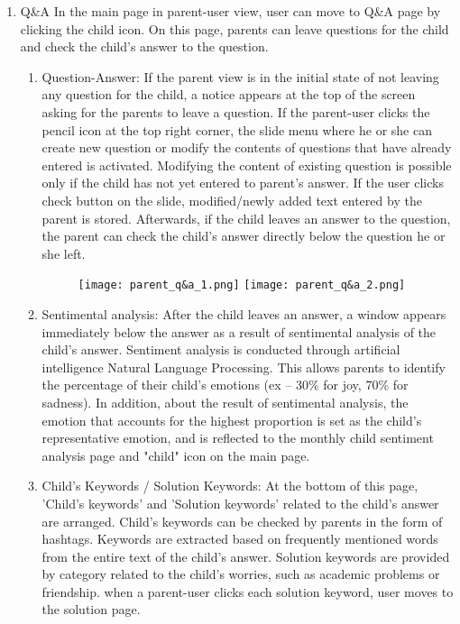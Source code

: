 \documentclass[conference]{IEEEtran}
\begin{document}
\begin{enumerate}
            \item Q\&A \hfill \break
            In the main page in parent-user view, user can move to Q\&A page by clicking the child icon. On this page, parents can leave questions for the child and check the child's answer to the question.
            
            \begin{enumerate}
                \item Question-Answer: If the parent view is in the initial state of not leaving any question for the child, a notice appears at the top of the screen asking for the parents to leave a question. If the parent-user clicks the pencil icon at the top right corner, the slide menu where he or she can create new question or modify the contents of questions that have already entered is activated. Modifying the content of existing question is possible only if the child has not yet entered to parent's answer. If the user clicks check button on the slide, modified/newly added text entered by the parent is stored. Afterwards, if the child leaves an answer to the question, the parent can check the child's answer directly below the question he or she left.
                 \begin{figure}[H]
                 \centering
                 \texttt{[image: parent\_q\&a\_1.png]}
                 \texttt{[image: parent\_q\&a\_2.png]}
                 \end{figure}
                \item Sentimental analysis:
                After the child leaves an answer, a window appears immediately below the answer as a result of sentimental analysis of the child's answer. Sentiment analysis is conducted through artificial intelligence Natural Language Processing. This allows parents to identify the percentage of their child's emotions (ex – 30\% for joy, 70\% for sadness). In addition, about the result of sentimental analysis, the emotion that accounts for the highest proportion is set as the child's representative emotion, and is reflected to the monthly child sentiment analysis page and "child" icon on the main page.
                \item Child's Keywords / Solution Keywords: At the bottom of this page, 'Child's keywords' and 'Solution keywords' related to the child's answer are arranged. Child's keywords can be checked by parents in the form of hashtags. Keywords are extracted based on frequently mentioned words from the entire text of the child's answer. Solution keywords are provided by category related to the child's worries, such as academic problems or friendship. when a parent-user clicks each solution keyword, user moves to the solution page. \begin{figure}[H]

\end{figure}
\end{enumerate}
\end{enumerate}
\end{document}
